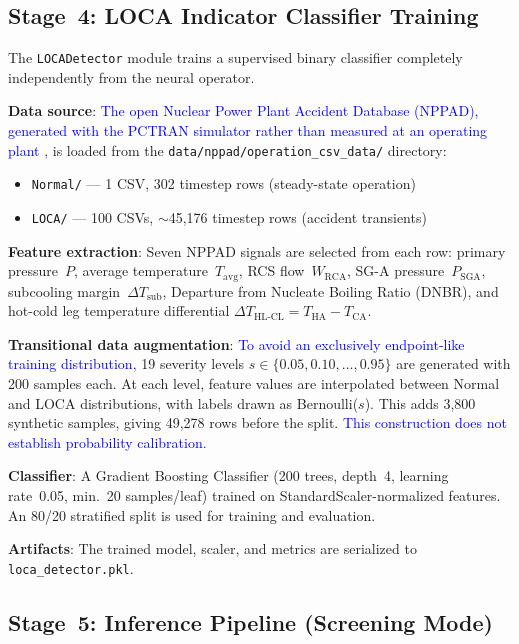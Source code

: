 \documentclass[journal]{IEEEtran}
\newcommand{\added}[1]{\textcolor{blue}{#1}}
\begin{document}
\subsection{Stage~4: LOCA Indicator Classifier Training}

The \texttt{LOCADetector} module trains a supervised binary classifier completely independently from the neural operator.

\textbf{Data source}:  \added{The open Nuclear Power Plant Accident Database (NPPAD), generated with the PCTRAN simulator rather than measured at an operating plant} \cite{qi2022nppad}, is loaded from the \texttt{data/nppad/operation\_csv\_data/} directory:
\begin{itemize}
    \item \texttt{Normal/} --- 1 CSV, 302 timestep rows (steady-state operation)
    \item \texttt{LOCA/} --- 100 CSVs, $\sim$45,176 timestep rows (accident transients)
\end{itemize}

\textbf{Feature extraction}: Seven NPPAD signals are selected from each row: primary pressure~$P$, average temperature~$T_\text{avg}$, RCS flow~$W_\text{RCA}$, SG-A pressure~$P_\text{SGA}$, subcooling margin~$\Delta T_\text{sub}$, Departure from Nucleate Boiling Ratio (DNBR), and hot-cold leg temperature differential $\Delta T_\text{HL-CL} = T_\text{HA} - T_\text{CA}$.

\textbf{Transitional data augmentation}:  \added{To avoid an exclusively endpoint-like training distribution,} 19 severity levels $s \in \{0.05, 0.10, \ldots, 0.95\}$ are generated with 200 samples each. At each level, feature values are interpolated between Normal and LOCA distributions, with labels drawn as Bernoulli($s$). This adds 3,800 synthetic samples, giving 49,278 rows before the split. \added{This construction does not establish probability calibration.}

\textbf{Classifier}: A Gradient Boosting Classifier (200 trees, depth~4, learning rate~0.05, min.\ 20 samples/leaf) trained on StandardScaler-normalized features. An 80/20 stratified split is used for training and evaluation.

\textbf{Artifacts}: The trained model, scaler, and metrics are serialized to \texttt{loca\_detector.pkl}.

\subsection{Stage~5: Inference Pipeline (Screening Mode)}
\label{sec:inference_pipeline}
\end{document}
